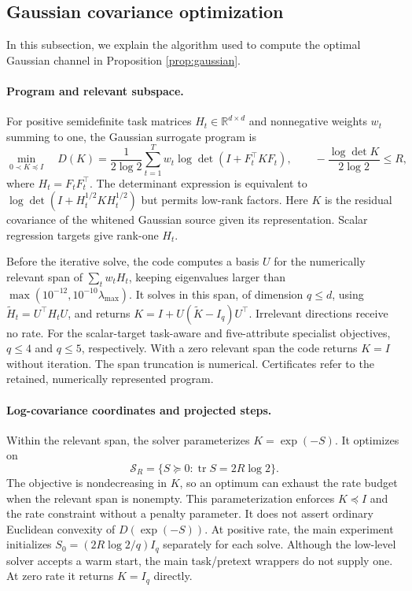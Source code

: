 \subsection{Gaussian covariance optimization}
\label{app:gaussian-solver}
In this subsection, we explain the algorithm used to compute the optimal Gaussian channel in Proposition \ref{prop:gaussian}.

\paragraph{Program and relevant subspace.}
For positive semidefinite task matrices $H_t\in\mathbb R^{d\times d}$ and
nonnegative weights $w_t$ summing to one, the Gaussian surrogate program is
\begin{equation}
 \min_{0\prec K\preceq I}\quad
 D(K)=\frac{1}{2\log 2}\sum_{t=1}^T w_t
          \log\det(I+F_t^\top K F_t),
 \qquad -\frac{\log\det K}{2\log 2}\le R,
 \label{eq:implemented-covariance-program}
\end{equation}
where $H_t=F_tF_t^\top$. The determinant expression is equivalent to
$\log\det(I+H_t^{1/2}KH_t^{1/2})$ but permits low-rank factors.
Here $K$ is the residual covariance of the whitened Gaussian source given
its representation. Scalar regression targets give rank-one $H_t$.

Before the iterative solve, the code computes a basis $U$ for the numerically
relevant span of $\sum_t w_tH_t$, keeping eigenvalues larger than
$\max(10^{-12},10^{-10}\lambda_{\max})$. It solves in this span, of dimension
$q\le d$, using $\widetilde H_t=U^\top H_tU$, and returns
$K=I+U(\widetilde K-I_q)U^\top$. Irrelevant directions receive no rate.
For the scalar-target task-aware and five-attribute specialist objectives,
$q\le4$ and $q\le5$, respectively. With a zero relevant span the code returns
$K=I$ without iteration. The span truncation is numerical. Certificates
refer to the retained, numerically represented program.

\paragraph{Log-covariance coordinates and projected steps.}
Within the relevant span, the solver parameterizes $K=\exp(-S)$.
It optimizes on
\[
 \mathcal S_R=\{S\succeq0:\operatorname{tr}S=2R\log2\}.
\]
The objective is nondecreasing in $K$, so an optimum can exhaust the rate
budget when the relevant span is nonempty. This parameterization enforces
$K\preceq I$ and the rate constraint without a penalty parameter.
It does not assert ordinary Euclidean convexity of $D(\exp(-S))$.
At positive rate, the main experiment initializes
$S_0=(2R\log2/q)I_q$ separately for each solve. Although the low-level solver
accepts a warm start, the main task/pretext wrappers do not supply one.
At zero rate it returns $K=I_q$ directly.

